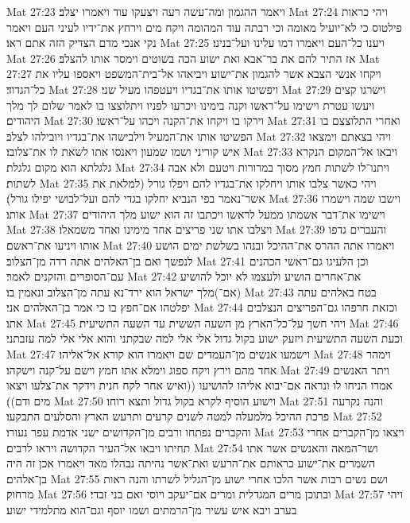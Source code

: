 Mat 27:23  ויאמר ההגמון ומה־עשה רעה ויצעקו עוד ויאמרו יצלב׃
Mat 27:24  ויהי כראות פילטוס כי לא־יועיל מאומה וכי רבתה עוד המהומה ויקח מים וירחץ את־ידיו לעיני העם ויאמר נקי אנכי מדם הצדיק הזה אתם ראו׃
Mat 27:25  ויענו כל־העם ויאמרו דמו עלינו ועל־בנינו׃
Mat 27:26  אז התיר להם את בר־אבא ואת ישוע הכה בשוטים וימסר אותו להצלב׃
Mat 27:27  ויקחו אנשי הצבא אשר להגמון את־ישוע ויביאהו אל־בית־המשפט ויאספו עליו את כל־הגדוד׃
Mat 27:28  ויפשיטו אותו את־בגדיו ויעטפהו מעיל שני׃
Mat 27:29  וישרגו קצים ויעשו עטרת וישימו על־ראשו וקנה בימינו ויכרעו לפניו ויתלוצצו בו לאמר שלום לך מלך היהודים׃
Mat 27:30  וירקו בו ויקחו את־הקנה ויכהו על־ראשו׃
Mat 27:31  ואחרי התלוצצם בו הפשיטו אותו את־המעיל וילבישהו את־בגדיו ויובילהו לצלב׃
Mat 27:32  ויהי בצאתם וימצאו איש קוריני ושמו שמעון ויאנסו אתו לשאת לו את־צלובו׃
Mat 27:33  ויבאו אל־המקום הנקרא גלגלתא הוא מקום גלגלת׃
Mat 27:34  ויתנו־לו לשתות חמץ מסוך במרורות ויטעם ולא אבה לשתות׃
Mat 27:35  ויהי כאשר צלבו אותו ויחלקו את־בגדיו להם ויפלו גורל (למלאת את אשר־נאמר בפי הנביא יחלקו בגדי להם ועל־לבושי יפילו גורל)׃
Mat 27:36  וישבו שמה וישמרו אותו׃
Mat 27:37  וישימו את־דבר אשמתו ממעל לראשו ויכתבו זה הוא ישוע מלך היהודים׃
Mat 27:38  ויצלבו אתו שני פריצים אחד מימינו ואחד משמאלו׃
Mat 27:39  והעברים גדפו אותו ויניעו את־ראשם׃
Mat 27:40  ויאמרו אתה ההרס את־ההיכל ובנהו בשלשת ימים הושע לנפשך ואם בן־האלהים אתה רדה מן־הצלוב׃
Mat 27:41  וכן הלעיגו גם־ראשי הכהנים עם־הסופרים והזקנים לאמר׃
Mat 27:42  את־אחרים הושיע ולעצמו לא יוכל להושיע (אם־)מלך ישראל הוא ירד־נא עתה מן־הצלוב ונאמין בו׃
Mat 27:43  בטח באלהים עתה יפלטהו אם־חפץ בו כי אמר בן־האלהים אני׃
Mat 27:44  וכזאת חרפהו גם־הפריצים הנצלבים אתו׃
Mat 27:45  ויהי חשך על־כל־הארץ מן השעה הששית עד השעה התשיעית׃
Mat 27:46  וכעת השעה התשיעית ויזעק ישוע בקול גדול אלי אלי למה שבקתני והוא אלי אלי למה עזבתני׃
Mat 27:47  וישמעו אנשים מן־העמדים שם ויאמרו הוא קורא אל־אליהו׃
Mat 27:48  וימהר אחד מהם וירץ ויקח ספוג וימלא אתו חמץ וישם על־קנה וישקהו׃
Mat 27:49  ויתר האנשים אמרו הניחו לו ונראה אם־יבוא אליהו להושיעו ((ואיש אחר לקח חנית וידקר את־צלעו ויצאו מים ודם))׃
Mat 27:50  וישוע הוסיף לקרא בקול גדול ותצא רוחו׃
Mat 27:51  והנה נקרעה פרכת ההיכל מלמעלה למטה לשנים קרעים ותרעש הארץ והסלעים התבקעו׃
Mat 27:52  והקברים נפתחו ורבים מן־הקדושים ישני אדמת עפר נעורו׃
Mat 27:53  ויצאו מן־הקברים אחרי תחיתו ויבאו אל־העיר הקדושה ויראו לרבים׃
Mat 27:54  ושר־המאה והאנשים אשר אתו השמרים את־ישוע כראותם את־הרעש ואת־אשר נהיתה נבהלו מאד ויאמרו אכן זה היה בן־אלהים׃
Mat 27:55  ושם נשים רבות אשר הלכו אחרי ישוע מן־הגליל לשרתו והנה ראות מרחוק׃
Mat 27:56  ובתוכן מרים המגדלית ומרים אם־יעקב ויוסי ואם בני זבדי׃
Mat 27:57  ויהי בערב ויבא איש עשיר מן־הרמתים ושמו יוסף וגם־הוא מתלמידי ישוע׃
